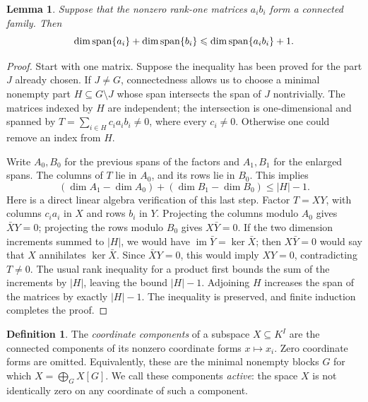 \documentclass[11pt,a4paper]{article}
\numberwithin{equation}{section}
\theoremstyle{plain}
\newtheorem{lemma}[theorem]{Lemma}
\theoremstyle{definition}
\newtheorem{definition}[theorem]{Definition}
\DeclareMathOperator{\im}{im}\DeclareMathOperator{\supp}{supp}
\newcommand{\leqs}{\leqslant}\newcommand{\geqs}{\geqslant}
\begin{document}
\begin{lemma}\label{lem:connected}
Suppose that the nonzero rank-one matrices $a_i b_i$ form a connected
family. Then
\[
 \dim\Span\{a_i\}+\dim\Span\{b_i\}
       \leqs\dim\Span\{a_i b_i\}+1.
\]
\end{lemma}
\begin{proof}
Start with one matrix. Suppose the inequality has been proved for the
part $J$ already chosen. If $J\ne G$, connectedness allows us to choose
a minimal nonempty part $H\subseteq G\setminus J$ whose span intersects
the span of $J$ nontrivially. The matrices indexed by $H$ are independent;
the intersection is one-dimensional and spanned by
$T=\sum_{i\in H}c_i a_i b_i\ne0$, where every $c_i\ne0$.
Otherwise one could remove an index from $H$.

Write $A_0,B_0$ for the previous spans of the factors and $A_1,B_1$
for the enlarged spans. The columns of $T$ lie in $A_0$, and its rows
lie in $B_0$. This implies
\[
 (\dim A_1-\dim A_0)+(\dim B_1-\dim B_0)\leqs |H|-1.
\]
Here is a direct linear algebra verification of this last step.
Factor $T=XY$, with columns $c_i a_i$ in $X$ and rows $b_i$ in $Y$.
Projecting the columns modulo $A_0$ gives $\bar X Y=0$; projecting
the rows modulo $B_0$ gives $X\bar Y=0$.
If the two dimension increments summed to $|H|$, we would have
$\im\bar Y=\ker\bar X$; then $X\bar Y=0$ would say that $X$
annihilates $\ker\bar X$. Since $\bar X Y=0$, this would imply
$XY=0$, contradicting $T\ne0$. The usual rank inequality for a product
first bounds the sum of the increments by $|H|$, leaving the bound
$|H|-1$. Adjoining $H$ increases the span of the matrices by exactly
$|H|-1$. The inequality is preserved, and finite induction completes
the proof.
\end{proof}

\begin{definition}
The \emph{coordinate components} of a subspace $X\subseteq K^I$ are
the connected components of its nonzero coordinate forms $x\mapsto x_i$.
Zero coordinate forms are omitted. Equivalently, these are the minimal
nonempty blocks $G$ for which $X=\bigoplus_G X[G]$.
We call these components \emph{active}: the space $X$ is not identically
zero on any coordinate of such a component.
\end{definition}
\end{document}
